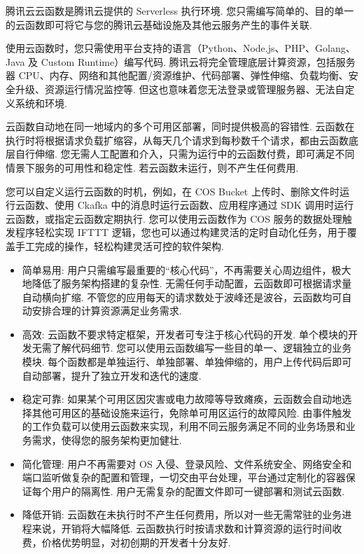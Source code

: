 \begin{definition}
    腾讯云云函数是腾讯云提供的 Serverless 执行环境. 您只需编写简单的、目的单一的云函数即可将它与您的腾讯云基础设施及其他云服务产生的事件关联. 

使用云函数时，您只需使用平台支持的语言（Python、Node.js、PHP、Golang、Java 及 Custom Runtime）编写代码. 腾讯云将完全管理底层计算资源，包括服务器 CPU、内存、网络和其他配置/资源维护、代码部署、弹性伸缩、负载均衡、安全升级、资源运行情况监控等. 但这也意味着您无法登录或管理服务器、无法自定义系统和环境. 

云函数自动地在同一地域内的多个可用区部署，同时提供极高的容错性. 云函数在执行时将根据请求负载扩缩容，从每天几个请求到每秒数千个请求，都由云函数底层自行伸缩. 您无需人工配置和介入，只需为运行中的云函数付费，即可满足不同情景下服务的可用性和稳定性. 若云函数未运行，则不产生任何费用. 

您可以自定义运行云函数的时机，例如，在 COS Bucket 上传时、删除文件时运行云函数、使用 Ckafka 中的消息时运行云函数、应用程序通过 SDK 调用时运行云函数，或指定云函数定期执行. 您可以使用云函数作为 COS 服务的数据处理触发程序轻松实现 IFTTT 逻辑，您也可以通过构建灵活的定时自动化任务，用于覆盖手工完成的操作，轻松构建灵活可控的软件架构. 

\begin{itemize}
    \item 简单易用: 用户只需编写最重要的“核心代码”，不再需要关心周边组件，极大地降低了服务架构搭建的复杂性. 无需任何手动配置，云函数即可根据请求量自动横向扩缩. 不管您的应用每天的请求数处于波峰还是波谷，云函数均可自动安排合理的计算资源满足业务需求. 
    \item 高效: 云函数不要求特定框架，开发者可专注于核心代码的开发. 单个模块的开发无需了解代码细节. 您可以使用云函数编写一些目的单一、逻辑独立的业务模块. 每个函数都是单独运行、单独部署、单独伸缩的，用户上传代码后即可自动部署，提升了独立开发和迭代的速度. 
    \item 稳定可靠: 如果某个可用区因灾害或电力故障等导致瘫痪，云函数会自动地选择其他可用区的基础设施来运行，免除单可用区运行的故障风险. 由事件触发的工作负载可以使用云函数来实现，利用不同云服务满足不同的业务场景和业务需求，使得您的服务架构更加健壮. 
    \item 简化管理: 用户不再需要对 OS 入侵、登录风险、文件系统安全、网络安全和端口监听做复杂的配置和管理，一切交由平台处理，平台通过定制化的容器保证每个用户的隔离性. 用户无需复杂的配置文件即可一键部署和测试云函数. 
    \item 降低开销: 云函数在未执行时不产生任何费用，所以对一些无需常驻的业务进程来说，开销将大幅降低. 云函数执行时按请求数和计算资源的运行时间收费，价格优势明显，对初创期的开发者十分友好. 
\end{itemize}
\end{definition}

